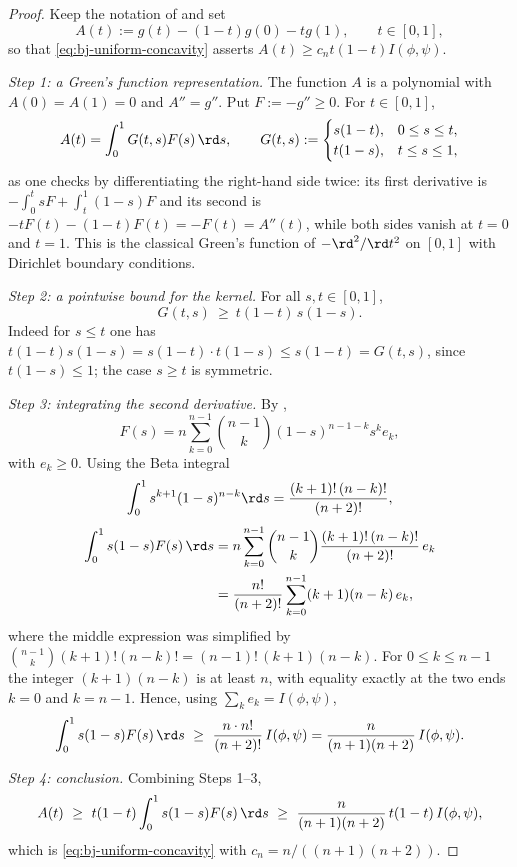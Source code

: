\begin{proof}
Keep the notation of  and set
\[
 A(t):=g(t)-(1-t)g(0)-tg(1),
 \qquad t\in[0,1],
\]
so that \eqref{eq:bj-uniform-concavity} asserts
$A(t)\ge c_nt(1-t)I(\phi,\psi)$.

\emph{Step 1: a Green's function representation.}  The function $A$ is a
polynomial with $A(0)=A(1)=0$ and $A''=g''$.  Put $F:=-g''\ge0$.  For
$t\in[0,1]$,
\[
 A(t)=\int_0^1G(t,s)F(s)\,\rd s,
 \qquad
 G(t,s):=\begin{cases}s(1-t),& 0\le s\le t,\\ t(1-s),& t\le s\le1,\end{cases}
\]
as one checks by differentiating the right-hand side twice: its first
derivative is $-\int_0^tsF+\int_t^1(1-s)F$ and its second is
$-tF(t)-(1-t)F(t)=-F(t)=A''(t)$, while both sides vanish at $t=0$ and
$t=1$.  This is the classical Green's function of $-\rd^2/\rd t^2$ on
$[0,1]$ with Dirichlet boundary conditions.

\emph{Step 2: a pointwise bound for the kernel.}  For all
$s,t\in[0,1]$,
\[
 G(t,s)\ \ge\ t(1-t)\,s(1-s).
\]
Indeed for $s\le t$ one has
$t(1-t)s(1-s)=s(1-t)\cdot t(1-s)\le s(1-t)=G(t,s)$, since
$t(1-s)\le1$; the case $s\ge t$ is symmetric.

\emph{Step 3: integrating the second derivative.}  By
,
\[
 F(s)=n\sum_{k=0}^{n-1}\binom{n-1}{k}(1-s)^{n-1-k}s^ke_k,
\]
with
$e_k\ge0$.  Using the Beta integral
\[
 \int_0^1s^{k+1}(1-s)^{n-k}\rd s
  =\frac{(k+1)!\,(n-k)!}{(n+2)!},
\]
\[
 \begin{aligned}
  \int_0^1s(1-s)F(s)\,\rd s
   &=n\sum_{k=0}^{n-1}\binom{n-1}{k}
     \frac{(k+1)!\,(n-k)!}{(n+2)!}\,e_k\\
   &=\frac{n!}{(n+2)!}
     \sum_{k=0}^{n-1}(k+1)(n-k)\,e_k,
 \end{aligned}
\]
where the middle expression was simplified by
$\binom{n-1}{k}(k+1)!(n-k)!=(n-1)!\,(k+1)(n-k)$.  For
$0\le k\le n-1$ the integer $(k+1)(n-k)$ is at least $n$, with
equality exactly at the two ends $k=0$ and $k=n-1$.  Hence, using
$\sum_ke_k=I(\phi,\psi)$,
\[
 \int_0^1s(1-s)F(s)\,\rd s
 \ \ge\ \frac{n\cdot n!}{(n+2)!}\,I(\phi,\psi)
 =\frac{n}{(n+1)(n+2)}\,I(\phi,\psi).
\]

\emph{Step 4: conclusion.}  Combining Steps 1--3,
\[
 A(t)\ \ge\ t(1-t)\int_0^1s(1-s)F(s)\,\rd s
 \ \ge\ \frac{n}{(n+1)(n+2)}\,t(1-t)\,I(\phi,\psi),
\]
which is \eqref{eq:bj-uniform-concavity} with
$c_n=n/((n+1)(n+2))$.
\end{proof}

